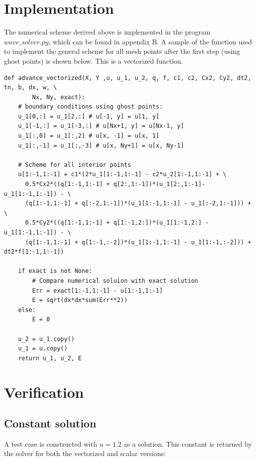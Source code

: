\documentclass[twoside]{article}
\begin{document}
\noindent


\section{Implementation}

The numerical scheme derived above is implemented in the program $wave\_solver.py$, which can be found in appendix B. A sample of the function used to implement the general scheme for all mesh points after the first step (using ghost points) is shown below. This is a vectorized function.

\begin{verbatim}
def advance_vectorized(X, Y ,u, u_1, u_2, q, f, c1, c2, Cx2, Cy2, dt2, tn, b, dx, w, \
		Nx, Ny, exact):
    # boundary conditions using ghost points:
    u_1[0,:] = u_1[2,:] # u[-1, y] = u[1, y]
    u_1[-1,:] = u_1[-3,:] # u[Nx+1, y] = u[Nx-1, y]
    u_1[:,0] = u_1[:,2] # u[x, -1] = u[x, 1]
    u_1[:,-1] = u_1[:,-3] # u[x, Ny+1] = u[x, Ny-1]
    
    # Scheme for all interior points
    u[1:-1,1:-1] = c1*(2*u_1[1:-1,1:-1] - c2*u_2[1:-1,1:-1] + \
      0.5*Cx2*((q[1:-1,1:-1] + q[2:,1:-1])*(u_1[2:,1:-1]-u_1[1:-1,1:-1]) - \
      (q[1:-1,1:-1] + q[:-2,1:-1])*(u_1[1:-1,1:-1] - u_1[:-2,1:-1])) + \
      0.5*Cy2*((q[1:-1,1:-1] + q[1:-1,2:])*(u_1[1:-1,2:] - u_1[1:-1,1:-1]) - \
      (q[1:-1,1:-1] + q[1:-1,:-2])*(u_1[1:-1,1:-1] - u_1[1:-1,:-2])) + dt2*f[1:-1,1:-1])
      
    if exact is not None:
        # Compare numerical soluion with exact solution
        Err = exact[1:-1,1:-1] - u[1:-1,1:-1]  
        E = sqrt(dx*dx*sum(Err**2))
    else:
        E = 0
    
    u_2 = u_1.copy()
    u_1 = u.copy()
    return u_1, u_2, E
\end{verbatim}



\section{Verification}

\subsection{Constant solution}

A test case is constructed with $u = 1.2$ as a solution. This constant is returned by the solver for both the vectorized and scalar versions:
\end{document}
